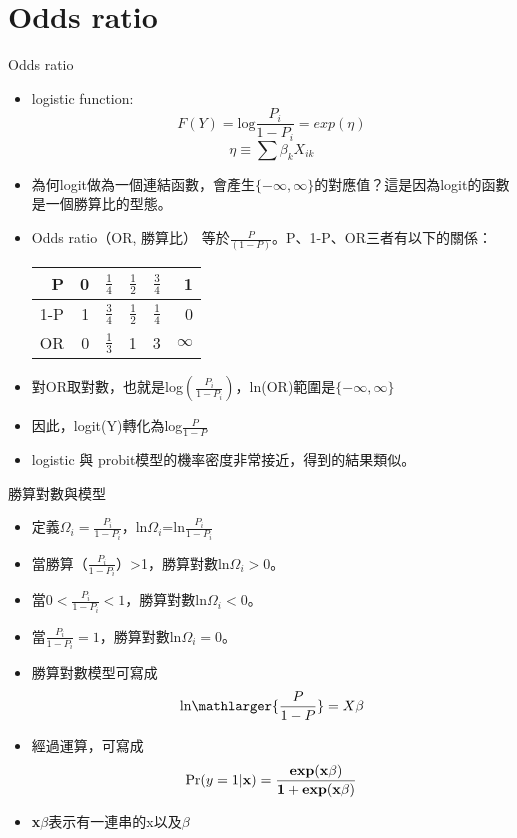 \documentclass[border=10pt]{beamer}
\begin{document}
\section{Odds ratio}
\begin{frame}{Odds ratio}
\begin{itemize}
\item logistic function: \[F(Y)=\text{log} \frac{P_{i}}{1-P_{i}}=exp(\eta) \]
\[ \eta \equiv \sum \beta_{k}X_{ik}\]
\item 為何logit做為一個連結函數，會產生$\{-\infty, \infty \}$的對應值？這是因為logit的函數是一個勝算比的型態。
\item Odds ratio（OR, 勝算比） 等於$\frac{P}{(1-P)}$。P、1-P、OR三者有以下的關係：
\begin{table}
\begin{center}
\begin{tabular}{| r | r | r | r | r | r |}
\hline
P & 0 & $\frac{1}{4}$ &  $\frac{1}{2}$ & $\frac{3}{4}$ & 1 \\
\hline
1-P & 1 & $\frac{3}{4}$ & $\frac{1}{2}$ & $\frac{1}{4}$ & 0 \\
\hline
OR & 0 & $\frac{1}{3}$ & 1 & 3 & $\infty$ \\
\hline
\end{tabular}
\end{center}
\end{table}
\item 對OR取對數，也就是log$(\frac{P_{i}}{1-P_{i}})$，ln(OR)範圍是$\{-\infty, \infty \}$
\item 因此，logit(Y)轉化為log$\frac{P}{1-P}$
\item logistic 與 probit模型的機率密度非常接近，得到的結果類似。
\end{itemize}
\end{frame}
\begin{frame}{勝算對數與模型}
\begin{itemize}
\item 定義$\Omega_{i}=\frac{P_{i}}{1-P_{i}}$，ln$\Omega_{i}$=ln$\frac{P_{i}}{1-P_{i}}$
\item 當勝算（$\frac{P_{i}}{1-P_{i}}$）>1，勝算對數ln$\Omega_{i}>0$。
\item 當$0<\frac{P_{i}}{1-P_{i}}<1$，勝算對數ln$\Omega_{i}<0$。
\item 當$\frac{P_{i}}{1-P_{i}}=1$，勝算對數ln$\Omega_{i}=0$。
\item 勝算對數模型可寫成
\[\text{ln}\mathlarger{\frac{P}{1-P}}=X\beta \]
\item 經過運算，可寫成
\[\text{Pr}(y=1|\bf{x})=\frac{exp(\bf{x\beta})}{1+exp(\bf{x\beta})}\]
\item \textbf{x$\beta$}表示有一連串的x以及$\beta$
\end{itemize}
\end{frame}
\end{document}
